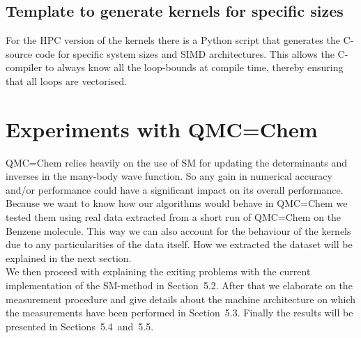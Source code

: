 \documentclass[11pt]{article}
\numberwithin{figure}{section}
\numberwithin{table}{section}
\begin{document}
    \subsection{Template to generate kernels for specific sizes}
    	For the HPC version of the kernels there is a Python script that generates the C-source code for specific system sizes and SIMD architectures. This allows the C-compiler to always know all the loop-bounds at compile time, thereby ensuring that all loops are vectorised.
			
  \section{Experiments with QMC=Chem}
    QMC=Chem relies heavily on the use of SM for updating the determinants and inverses in the many-body wave function. So any gain in numerical accuracy and/or performance could have a significant impact on its overall performance.\\
    
    Because we want to know how our algorithms would behave in QMC=Chem we tested them using real data extracted from a short run of QMC=Chem on the Benzene molecule. This way we can also account for the behaviour of the kernels due to any particularities of the data itself. How we extracted the dataset will be explained in the next section.\\
    
    We then proceed with explaining the exiting problems with the current implementation of the SM-method in Section~5.2. After that we elaborate on the measurement procedure and give details about the machine architecture on which the measurements have been performed in Section~5.3. Finally the results will be presented in Sections~5.4~and~5.5.
    
\end{document}
